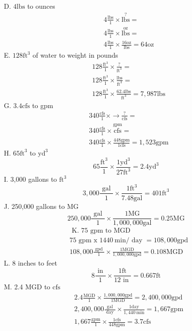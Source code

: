 D. $4 \mathrm{lbs}$ to ounces
$$
\begin{aligned}
& 4 \frac{\mathrm{lbs}}{1} \times \stackrel{?}{\mathrm{lbs}}= \\
& 4 \frac{\mathrm{lbs}}{1} \times \stackrel{\mathrm{oz}}{\mathrm{lbs}}= \\
& 4 \frac{\mathrm{lbs}}{1} \times \frac{16 \mathrm{oz}}{\mathrm{lbs}}=64 \mathrm{oz}
\end{aligned}
$$
E. $128 \mathrm{ft}^{3}$ of water to weight in pounds
$$
\begin{aligned}
&128 \frac{\mathrm{ft}^{3}}{1} \times \frac{?}{\mathrm{ft}^{3}}= \\
&128 \frac{\mathrm{ft}^{3}}{1} \times \frac{\mathrm{lbs}}{\mathrm{ft}^{3}}= \\
&128 \frac{\mathrm{ft}^{3}}{1} \times \frac{62.4 \mathrm{lbs}}{\mathrm{ft}^{3}}=7,987 \mathrm{lbs}
\end{aligned}
$$
G. $3.4 \mathrm{cfs}$ to gpm
$$
\begin{aligned}
& 340 \frac{\mathrm{cfs}}{1} \times \longrightarrow \frac{?}{\mathrm{cfs}}= \\
& 340 \frac{\mathrm{cfs}}{1} \times \stackrel{\mathrm{gpm}}{\mathrm{cfs}}= \\
& 340 \frac{\mathrm{cfs}}{1} \times \frac{448 \mathrm{gpm}}{1 \mathrm{cfs}}=1,523 \mathrm{gpm}
\end{aligned}
$$
H. $65 \mathrm{ft}^{3}$ to $\mathrm{yd}^{3}$
$$
65 \frac{\mathrm{ft}^{3}}{1} \times \frac{1 \mathrm{yd}^{3}}{27 \mathrm{ft}^{3}}=2.4 \mathrm{yd}^{3}
$$
I. 3,000 gallons to $\mathrm{ft}^{3}$
$$
3,000 \frac{\text { gal }}{1} \times \frac{1 \mathrm{ft}^{3}}{7.48 \mathrm{gal}}=401 \mathrm{ft}^{3}
$$
J. 250,000 gallons to $\mathrm{MG}$
$$
250,000 \frac{\text { gal }}{1} \times \frac{1 \mathrm{MG}}{1,000,000 \mathrm{gal}}=0.25 \mathrm{MG}
$$
$$
\begin{aligned}
&\text { K. } 75 \text { gpm to MGD } \\
&75 \text { gpm x } 1440 \mathrm{~min} / \text { day }=108,000 \mathrm{gpd} \\
&108,000 \frac{\text { gpd }}{1} \times \frac{1 \mathrm{MGD}}{1,000,000 \mathrm{gpd}}=0.108 \mathrm{MGD}
\end{aligned}
$$
L. 8 inches to feet
$$
8 \frac{\text { in }}{1} \times \frac{1 \mathrm{ft}}{12 \text { in }}=0.667 \mathrm{ft}
$$
M. 2.4 MGD to $\mathrm{cfs}$
$$
\begin{aligned}
&2.4 \frac{\mathrm{MGD}}{1} \times \frac{1,000,000 \mathrm{gpd}}{1 \mathrm{MGD}}=2,400,000 \mathrm{gpd} \\
&2,400,000 \frac{\mathrm{gal}}{\text { day }} \times \frac{1 \mathrm{day}}{1,440 \mathrm{~min}}=1,667 \mathrm{gpm} \\
&1,667 \frac{\mathrm{gpm}}{1} \times \frac{1 \mathrm{cfs}}{448 \mathrm{gpm}}=3.7 \mathrm{cfs}
\end{aligned}
$$
